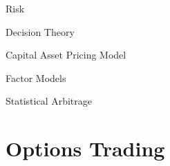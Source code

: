 \documentclass{beamer}
\begin{document}
\begin{frame}{Risk}
\end{frame}

\begin{frame}{Decision Theory}
\end{frame}

\begin{frame}{Capital Asset Pricing Model}
\end{frame}

\begin{frame}{Factor Models}
\end{frame}

\begin{frame}{Statistical Arbitrage}
\end{frame}

\section{Options Trading}
\end{document}
